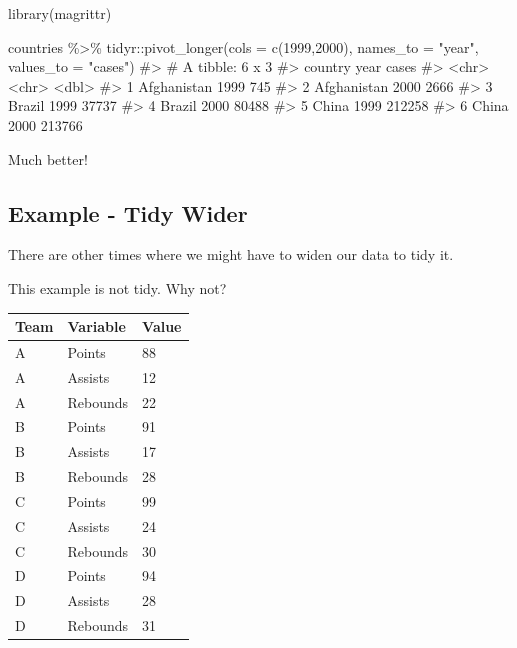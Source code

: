 \documentclass[
  letterpaper,
  DIV=11,
  numbers=noendperiod]{scrreprt}
\newenvironment{Shaded}{\begin{snugshade}}{\end{snugshade}}
\newcommand{\AttributeTok}[1]{\textcolor[rgb]{0.40,0.45,0.13}{#1}}
\newcommand{\CommentTok}[1]{\textcolor[rgb]{0.37,0.37,0.37}{#1}}
\newcommand{\FunctionTok}[1]{\textcolor[rgb]{0.28,0.35,0.67}{#1}}
\newcommand{\NormalTok}[1]{\textcolor[rgb]{0.00,0.23,0.31}{#1}}
\newcommand{\SpecialCharTok}[1]{\textcolor[rgb]{0.37,0.37,0.37}{#1}}
\newcommand{\StringTok}[1]{\textcolor[rgb]{0.13,0.47,0.30}{#1}}
\begin{document}
\begin{Shaded}
\begin{Highlighting}[]
\FunctionTok{library}\NormalTok{(magrittr)}

\NormalTok{countries }\SpecialCharTok{\%\textgreater{}\%} 
\NormalTok{  tidyr}\SpecialCharTok{::}\FunctionTok{pivot\_longer}\NormalTok{(}\AttributeTok{cols =} \FunctionTok{c}\NormalTok{(}\StringTok{\textasciigrave{}}\AttributeTok{1999}\StringTok{\textasciigrave{}}\NormalTok{,}\StringTok{\textasciigrave{}}\AttributeTok{2000}\StringTok{\textasciigrave{}}\NormalTok{), }\AttributeTok{names\_to =} \StringTok{"year"}\NormalTok{, }\AttributeTok{values\_to =} \StringTok{"cases"}\NormalTok{)}
\CommentTok{\#\textgreater{} \# A tibble: 6 x 3}
\CommentTok{\#\textgreater{}   country     year   cases}
\CommentTok{\#\textgreater{}   \textless{}chr\textgreater{}       \textless{}chr\textgreater{}  \textless{}dbl\textgreater{}}
\CommentTok{\#\textgreater{} 1 Afghanistan 1999     745}
\CommentTok{\#\textgreater{} 2 Afghanistan 2000    2666}
\CommentTok{\#\textgreater{} 3 Brazil      1999   37737}
\CommentTok{\#\textgreater{} 4 Brazil      2000   80488}
\CommentTok{\#\textgreater{} 5 China       1999  212258}
\CommentTok{\#\textgreater{} 6 China       2000  213766}
\end{Highlighting}
\end{Shaded}

Much better!

\subsection{Example - Tidy Wider}\label{example---tidy-wider}

There are other times where we might have to widen our data to tidy it.

This example is not tidy. Why not?

\begin{longtable}[]{@{}lll@{}}
\toprule\noalign{}
Team & Variable & Value \\
\midrule\noalign{}
\endhead
\bottomrule\noalign{}
\endlastfoot
A & Points & 88 \\
A & Assists & 12 \\
A & Rebounds & 22 \\
B & Points & 91 \\
B & Assists & 17 \\
B & Rebounds & 28 \\
C & Points & 99 \\
C & Assists & 24 \\
C & Rebounds & 30 \\
D & Points & 94 \\
D & Assists & 28 \\
D & Rebounds & 31 \\
\end{longtable}
\end{document}
